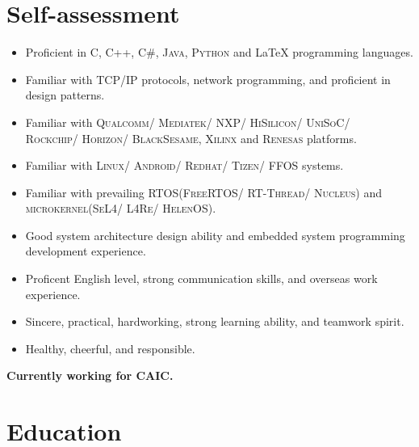 \documentclass{resume}
\begin{document}
\section{Self-assessment}
\begin{itemize}
  \setlength\itemsep{0.2ex}
  \item Proficient in \textsc{C}, \textsc{C++}, \textsc{C\#}, \textsc{Java}, \textsc{Python} and {\LaTeX} programming languages.
  \item Familiar with \textsc{TCP/IP} protocols, network programming, and proficient in design patterns.
  \item Familiar with \textsc{Qualcomm}/ \textsc{Mediatek}/ \textsc{NXP}/ \textsc{HiSilicon}/ \textsc{UniSoC}/ \\
  \hspace*{5.4em} \textsc{Rockchip}/ \textsc{Horizon}/ \textsc{BlackSesame}, \textsc{Xilinx} and \textsc{Renesas} platforms.
  \item Familiar with \textsc{Linux}/ \textsc{Android}/ \textsc{Redhat}/ \textsc{Tizen}/ \textsc{FFOS} systems.
  \item Familiar with prevailing \textsc{RTOS}(\textsc{FreeRTOS}/ \textsc{RT-Thread}/ \textsc{Nucleus}) and \textsc{microkernel}(\textsc{SeL4}/ \textsc{L4Re}/ \textsc{HelenOS}).
  \item Good system architecture design ability and embedded system programming development experience.
  \item Proficent English level, strong communication skills, and overseas work experience.
  \item Sincere, practical, hardworking, strong learning ability, and teamwork spirit.
  \item Healthy, cheerful, and responsible.
\end{itemize}
\hspace*{1.4em} \textbf{Currently working for CAIC.}
\spaceline{}

\section{Education}


\spaceline{}
\end{document}
